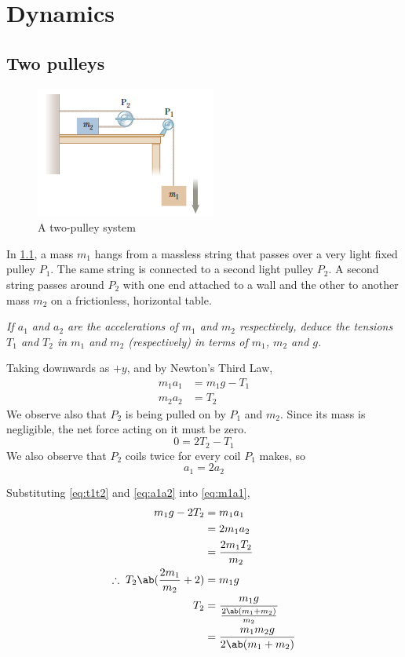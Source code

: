 \chapter{Dynamics}

\section{Two pulleys}
\begin{figure}[htpb]
  \centering
  \includegraphics{assets/twopulleys.png}
  \caption{A two-pulley system}
  \label{fig:twopulleys}
\end{figure}

In \cref{fig:twopulleys}, a mass \(m_1\) hangs from a massless string
that passes over a very light fixed pulley \(P_1\).
The same string is connected to a second light pulley \(P_2\). A
second string passes around \(P_2\) with one end
attached to a wall and the other to another mass \(m_2\) on a
frictionless, horizontal table.

\it{If \(a_1\) and \(a_2\) are the accelerations of \(m_1\) and
  \(m_2\) respectively,
  deduce the tensions \(T_1\) and \(T_2\) in \(m_1\) and \(m_2\)
  (respectively) in terms of
  \(m_1\), \(m_2\) and \(g\).
}

Taking downwards as \(+y\), and by Newton's Third Law,
\begin{align}
  \label{eq:m1a1}
  m_1a_1 &= m_1g-T_1 \\
  m_2a_2 &= T_2
  \label{eq:m2a2}
\end{align}
We observe also that \(P_2\) is being pulled on by \(P_1\) and
\(m_2\). Since its
mass is negligible, the net force acting on it must be zero.
\begin{equation}
  0 = 2T_2 - T_1
  \label{eq:t1t2}
\end{equation}
We also observe that \(P_2\) coils twice for every coil \(P_1\) makes, so
\begin{equation}
  a_1 = 2a_2
  \label{eq:a1a2}
\end{equation}

Substituting \cref{eq:t1t2} and \cref{eq:a1a2} into \cref{eq:m1a1},
\begin{align*}
  m_1g - 2T_2 &= m_1a_1 \\
  &= 2m_1a_2 \\
  &= \f{2m_1T_2}{m_2} \\
  \therefore\; T_2\ab(\f{2m_1}{m_2}+2) &= m_1g \\
  T_2 &= \f{m_1g}{ \f{2\ab(m_1+m_2)}{m_2} } \\
  &= \f{m_1m_2g}{2\ab(m_1+m_2)}
\end{align*}

